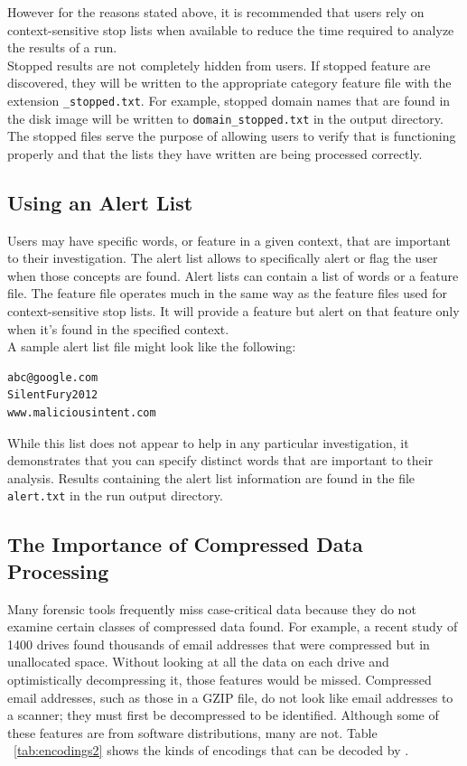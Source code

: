 \documentclass[11pt]{article} %
\begin{document}
However for the reasons stated above, it is recommended that users rely on context-sensitive stop lists when available to reduce the time required to analyze the results of a \bulk run.\\

Stopped results are not completely hidden from users. If stopped feature are discovered, they will be written to the appropriate category feature file with the extension \texttt{\_stopped.txt}. For example, stopped domain names that are found in the disk image will be written to \texttt{domain\_stopped.txt} in the output directory. The stopped files serve the purpose of allowing users to verify that \bulk is functioning properly and that the lists they have written are being processed correctly.

\subsection{Using an Alert List}
Users may have specific words, or feature in a given context, that are important to their investigation. The alert list allows \bulk to specifically alert or flag the user when those concepts are found. Alert lists can contain a list of words or a feature file. The feature file operates much in the same way as the feature files used for context-sensitive stop lists. It will provide a feature but alert on that feature only when it's found in the specified context.\\

A sample alert list file might look like the following:
\begin{verbatim}
abc@google.com
SilentFury2012
www.maliciousintent.com
\end{verbatim}

While this list does not appear to help in any particular investigation, it demonstrates that you can specify distinct words that are important to their analysis. Results containing the alert list information are found in the file \texttt{alert.txt} in the run output directory.

\subsection{The Importance of Compressed Data Processing}
\label{compressedProcessing}

Many forensic tools frequently miss case-critical data because they do not examine certain classes of compressed data found. For example, a recent study of 1400 drives found thousands of email addresses that were compressed but in unallocated space\cite{encodedEvidence}. Without looking at all the data on each drive and optimistically decompressing it, those features would be missed. Compressed email addresses, such as those in a GZIP file, do not look like email addresses to a scanner; they must first be decompressed to be identified. Although some of these features are from software distributions, many are not. Table ~\ref{tab:encodings2} shows the kinds of encodings that can be decoded by \bulk \cite{encodedEvidence}.
\end{document}
